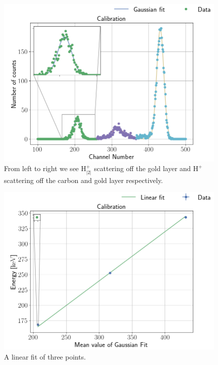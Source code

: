 \begin{figure}[t]
\centering
\includegraphics[width=0.99\columnwidth]{gaussian_fit2}
\caption{From left to right we see $\mathrm{H_|2|^{+}}$ scattering off the gold layer
and $\mathrm{H^+}$ scattering off the carbon and gold layer respectively.}
\label{fig_gaussian_fit2}
\end{figure}

\begin{figure}[t]
\centering
\includegraphics[width=0.99\columnwidth]{alpha_plotting}
\caption{A linear fit of three points.}
\label{fig_linear_fit2}
\end{figure}

